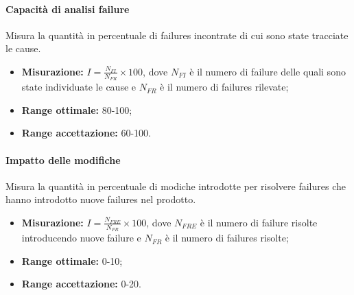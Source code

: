 			\paragraph{Capacità di analisi failure} \Spazio
			Misura la quantità in percentuale di failures incontrate di cui sono state tracciate le cause.
			\begin{itemize}
				\item {\textbf{Misurazione:} $I=\frac{N_{FI}}{N_{FR}}\times 100 $, dove $N_{FI}$ è il numero di failure delle quali sono state individuate le cause e $N_{FR}$ è il numero di failures rilevate};
				\item {\textbf{Range ottimale:} 80-100;}
				\item {\textbf{Range accettazione:} 60-100.}
			\end{itemize} 
			\paragraph{Impatto delle modifiche} \Spazio
			Misura la quantità in percentuale di modiche introdotte per risolvere failures che hanno introdotto nuove failures nel prodotto.
			\begin{itemize}
				\item {\textbf{Misurazione:} $I=\frac{N_{FRE}}{N_{FR}}\times 100 $, dove $N_{FRE}$ è il numero di failure risolte introducendo nuove failure e $N_{FR}$ è il numero di failures risolte};
				\item {\textbf{Range ottimale:} 0-10;}
				\item {\textbf{Range accettazione:} 0-20.}
			\end{itemize} 
